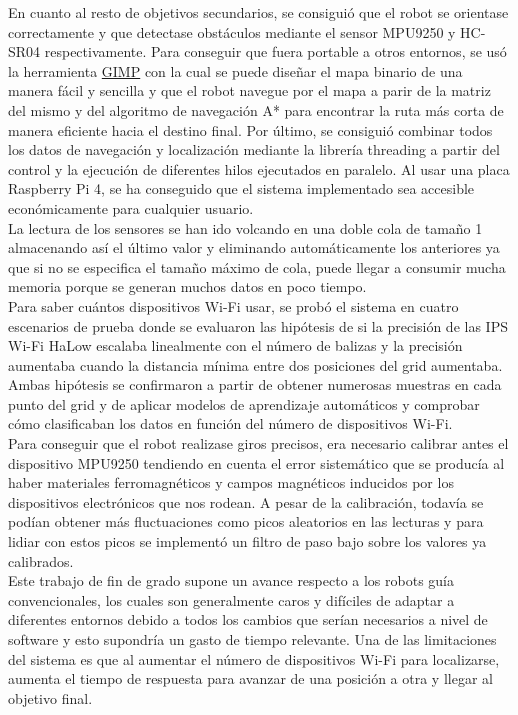 En cuanto al resto de objetivos secundarios, se consiguió que el robot se orientase correctamente y que detectase obstáculos mediante el sensor MPU9250 y HC-SR04 respectivamente. Para conseguir que fuera portable a otros entornos, se usó la herramienta \hyperlink{GIMP}{GIMP} con la cual se puede diseñar el mapa binario de una manera fácil y sencilla y que el robot navegue por el mapa a parir de la matriz del mismo y del algoritmo de navegación A* para encontrar la ruta más corta de manera eficiente hacia el destino final. Por último, se consiguió combinar todos los datos de navegación y localización mediante la librería threading a partir del control y la ejecución de diferentes hilos ejecutados en paralelo. Al usar una placa Raspberry Pi 4, se ha conseguido que el sistema implementado sea accesible económicamente para cualquier usuario.\\


La lectura de los sensores se han ido volcando en una doble cola de tamaño 1 almacenando así el último valor y eliminando automáticamente los anteriores ya que si no se especifica el tamaño máximo de cola, puede llegar a consumir mucha memoria porque se generan muchos datos en poco tiempo.\\


Para saber cuántos dispositivos Wi-Fi usar, se probó el sistema en cuatro escenarios de prueba donde se evaluaron las hipótesis de si la precisión de las IPS Wi-Fi HaLow escalaba linealmente con el número de balizas y la precisión aumentaba cuando la distancia mínima entre dos posiciones del grid aumentaba. Ambas hipótesis se confirmaron a partir de obtener numerosas muestras en cada punto del grid y de aplicar modelos de aprendizaje automáticos y comprobar cómo clasificaban los datos en función del número de dispositivos Wi-Fi.\\

Para conseguir que el robot realizase giros precisos, era necesario calibrar antes el dispositivo MPU9250 tendiendo en cuenta el error sistemático que se producía al haber materiales ferromagnéticos y campos magnéticos inducidos por los dispositivos electrónicos que nos rodean. A pesar de la calibración, todavía se podían obtener más fluctuaciones como picos aleatorios en las lecturas y para lidiar con estos picos se implementó un filtro de paso bajo sobre los valores ya calibrados.\\

Este trabajo de fin de grado supone un avance respecto a los robots guía convencionales, los cuales son generalmente caros y difíciles de adaptar a diferentes entornos debido a todos los cambios que serían necesarios a nivel de software y esto supondría un gasto de tiempo relevante. Una de las limitaciones del sistema es que al aumentar el número de dispositivos Wi-Fi para localizarse, aumenta el tiempo de respuesta para avanzar de una posición a otra y llegar al objetivo final.\\



